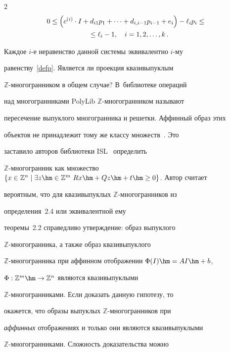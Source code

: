 \begin{multicols}{2}
\begin{multline}
\hspace*{-5.52576pt}0 \leq \left(c^{(i)}\cdot I + d_{i1}p_1 + \cdots + d_{i,i-1}p_{i-1} + e_i\right)- 

\ell_i p_i \leq {}\\

{}\leq\ell_i -1,\quad 

i=1,2,\ldots,k\,. 

\label{defpInequality0}

\end{multline}

Каждое $i$-е неравенство данной системы эквивалентно $i$-му

равенству~\eqref{defp}.  Является ли проекция квазивыпуклым

$\mathbb{Z}$-мно\-го\-гран\-ни\-ком в общем случае? В~библиотеке операций

над многогранниками PolyLib $\mathbb{Z}$-мно\-го\-гран\-ником называют

пересечение выпуклого многогранника и решетки. Аффинный образ этих

объектов не принадлежит тому же классу множеств~\cite{ZPolylib}. Это

заставило авторов библиотеки ISL~\cite{ISL} определить

$\mathbb{Z}$-мно\-го\-гран\-ник как множество $\{ x\in\mathbb{Z}^n \mid

\exists z\hm\in\mathbb{Z}^m\ Rx\hm+Qz\hm+t\hm\geq0 \}$. Автор считает

вероятным, что для квазивыпуклых $\mathbb{Z}$-мно\-го\-гран\-ни\-ков из

определения~2.4 или эквивалентной ему

теоремы~2.2 справедливо утверждение: образ выпуклого

$\mathbb{Z}$-мно\-го\-гран\-ника, а также образ квазивыпуклого

$\mathbb{Z}$-мно\-го\-гран\-ни\-ка при аффинном отоб\-ра\-же\-нии $\Phi(I)\hm=AI\hm+b$,

$\Phi:\mathbb{Z}^m\hm\to\mathbb{Z}^n$ являются квазивыпуклыми

$\mathbb{Z}$-мно\-го\-гран\-ни\-ка\-ми. Если доказать данную гипотезу, то

окажется, что образы вы\-пук\-лых $\mathbb{Z}$-мно\-го\-гран\-ни\-ков при

\textit{аффинных} отоб\-ра\-же\-ни\-ях и только они являются квазивыпуклыми

$\mathbb{Z}$-мно\-го\-гран\-ни\-ка\-ми. Сложность доказательства можно


\end{multicols}
